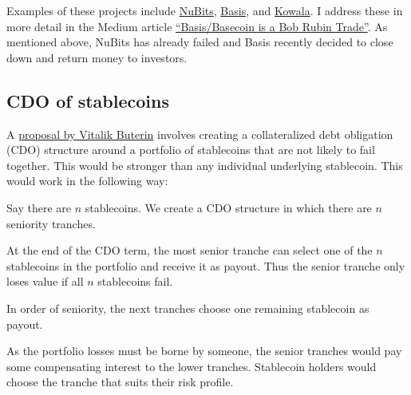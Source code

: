 \documentclass[10pt]{article}
\begin{document}
Examples of these projects include \href{https://nubits.com/}{NuBits}, \href{https://www.basis.io/}{Basis}, and \href{https://www.kowala.tech/}{Kowala}. I address these in more detail in the Medium article \href{https://medium.com/@aklamun/basis-basecoin-is-a-bob-rubin-trade-8c5b8af2a18b}{``Basis/Basecoin is a Bob Rubin Trade''}. As mentioned above, NuBits has already failed and Basis recently decided to close down and return money to investors.








\subsection{CDO of stablecoins}
A \href{https://ethresear.ch/t/collateralized-debt-obligations-for-issuer-backed-tokens/525}{proposal by Vitalik Buterin} involves creating a collateralized debt obligation (CDO) structure around a portfolio of stablecoins that are not likely to fail together. This would be stronger than any individual underlying stablecoin. This would work in the following way:
\begin{compactenum}
	\item Say there are $n$ stablecoins. We create a CDO structure in which there are $n$ seniority tranches.
	\item At the end of the CDO term, the most senior tranche can select one of the $n$ stablecoins in the portfolio and receive it as payout. Thus the senior tranche only loses value if all $n$ stablecoins fail.
	\item In order of seniority, the next tranches choose one remaining stablecoin as payout.
\end{compactenum}
As the portfolio losses must be borne by someone, the senior tranches would pay some compensating interest to the lower tranches. Stablecoin holders would choose the tranche that suits their risk profile.
\end{document}
